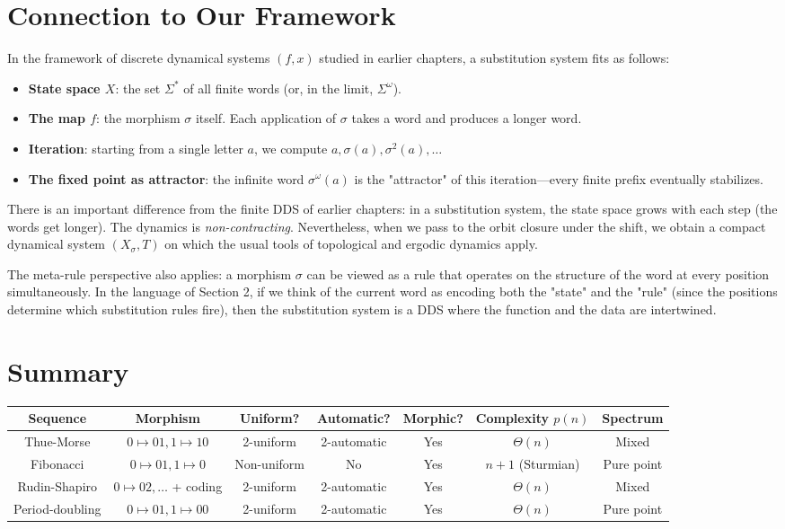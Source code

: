 \section{Connection to Our Framework}

In the framework of discrete dynamical systems $(f, x)$ studied in earlier chapters, a substitution system fits as follows:

\begin{itemize}
\item \textbf{State space $X$}: the set $\Sigma^*$ of all finite words (or, in the limit, $\Sigma^\omega$).
\item \textbf{The map $f$}: the morphism $\sigma$ itself. Each application of $\sigma$ takes a word and produces a longer word.
\item \textbf{Iteration}: starting from a single letter $a$, we compute $a, \sigma(a), \sigma^2(a), \ldots$
\item \textbf{The fixed point as attractor}: the infinite word $\sigma^\omega(a)$ is the "attractor" of this iteration---every finite prefix eventually stabilizes.
\end{itemize}

There is an important difference from the finite DDS of earlier chapters: in a substitution system, the state space grows with each step (the words get longer). The dynamics is \textit{non-contracting}. Nevertheless, when we pass to the orbit closure under the shift, we obtain a compact dynamical system $(X_\sigma, T)$ on which the usual tools of topological and ergodic dynamics apply.

The meta-rule perspective also applies: a morphism $\sigma$ can be viewed as a rule that operates on the structure of the word at every position simultaneously. In the language of Section 2, if we think of the current word as encoding both the "state" and the "rule" (since the positions determine which substitution rules fire), then the substitution system is a DDS where the function and the data are intertwined.



\section{Summary}

\begin{center}
\begin{tabular}{ccccccc}
\toprule
Sequence & Morphism & Uniform? & Automatic? & Morphic? & Complexity $p(n)$ & Spectrum \\
\midrule
Thue-Morse & $0 \mapsto 01, 1 \mapsto 10$ & 2-uniform & 2-automatic & Yes & $\Theta(n)$ & Mixed \\
Fibonacci & $0 \mapsto 01, 1 \mapsto 0$ & Non-uniform & No & Yes & $n+1$ (Sturmian) & Pure point \\
Rudin-Shapiro & $0 \mapsto 02, \ldots$ + coding & 2-uniform & 2-automatic & Yes & $\Theta(n)$ & Mixed \\
Period-doubling & $0 \mapsto 01, 1 \mapsto 00$ & 2-uniform & 2-automatic & Yes & $\Theta(n)$ & Pure point \\
\bottomrule
\end{tabular}
\end{center}

